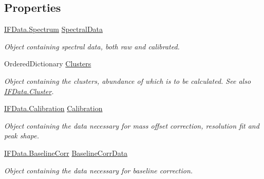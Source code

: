 \subsection*{Properties}
\begin{DoxyCompactItemize}
\item 
\mbox{\hyperlink{class_isotope_fit_1_1_i_f_data_1_1_spectrum}{I\+F\+Data.\+Spectrum}} \mbox{\hyperlink{class_isotope_fit_1_1_workspace_a1d6cc2dd07cbfe920da9f1bffc9b32c2}{Spectral\+Data}}
\begin{DoxyCompactList}\small\item\em Object containing spectral data, both raw and calibrated. \end{DoxyCompactList}\item 
Ordered\+Dictionary \mbox{\hyperlink{class_isotope_fit_1_1_workspace_a13958fbe0adace21990cb1eabbd421e9}{Clusters}}
\begin{DoxyCompactList}\small\item\em Object containing the clusters, abundance of which is to be calculated. See also \mbox{\hyperlink{class_isotope_fit_1_1_i_f_data_1_1_cluster}{I\+F\+Data.\+Cluster}}. \end{DoxyCompactList}\item 
\mbox{\hyperlink{class_isotope_fit_1_1_i_f_data_1_1_calibration}{I\+F\+Data.\+Calibration}} \mbox{\hyperlink{class_isotope_fit_1_1_workspace_a0ed1cfd6701db24de84f4ba67eed0442}{Calibration}}
\begin{DoxyCompactList}\small\item\em Object containing the data necessary for mass offset correction, resolution fit and peak shape. \end{DoxyCompactList}\item 
\mbox{\hyperlink{class_isotope_fit_1_1_i_f_data_1_1_baseline_corr}{I\+F\+Data.\+Baseline\+Corr}} \mbox{\hyperlink{class_isotope_fit_1_1_workspace_a700395fbb329b1a0fcb5932095db066f}{Baseline\+Corr\+Data}}
\begin{DoxyCompactList}\small\item\em Object containing the data necessary for baseline correction. \end{DoxyCompactList}\item 

\end{DoxyCompactItemize}

